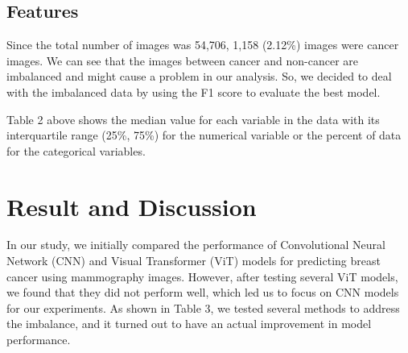 \documentclass[11pt,letterpaper, twocolumn]{article}
\begin{document}
\subsection{Features}
Since the total number of images was 54,706,  1,158 (2.12\%) images were cancer images. We can see that the images between cancer and non-cancer are imbalanced and might cause a problem in our analysis. So, we decided to deal with the imbalanced data by using the F1 score to evaluate the best model.
\begin{table}[h]
\caption{Median and Interquartile of features}
\end{table}

Table 2 above shows the median value for each variable in the data with its interquartile range (25\%, 75\%) for the numerical variable or the percent of data for the categorical variables.




\section{Result and Discussion}
In our study, we initially compared the performance of Convolutional Neural Network (CNN) and Visual Transformer (ViT) models for predicting breast cancer using mammography images. However, after testing several ViT models, we found that they did not perform well, which led us to focus on CNN models for our experiments. As shown in Table 3, we tested several methods to address the imbalance, and it turned out to have an actual improvement in model performance. 
\end{document}
